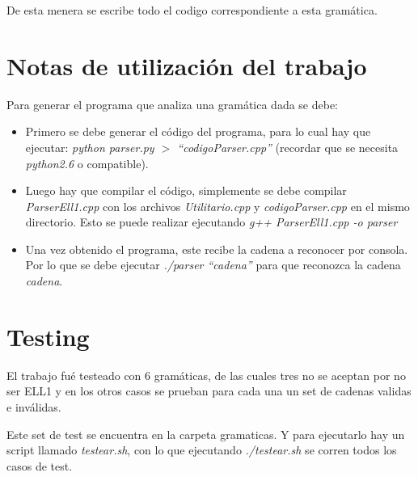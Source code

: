 \documentclass[a4paper]{report}
\begin{document}
De esta menera se escribe todo el codigo correspondiente a esta gramática.

\section*{Notas de utilización del trabajo}

Para generar el programa que analiza una gramática dada se debe:
\begin{itemize}
\item Primero se debe generar el código del programa, para lo cual hay que ejecutar: \emph{python parser.py $>$ ``codigoParser.cpp''} (recordar que se necesita \emph{python2.6} o compatible).
\item Luego hay que compilar el código, simplemente se debe compilar \emph{ParserEll1.cpp} con los archivos \emph{Utilitario.cpp} y \emph{codigoParser.cpp} en el mismo directorio. Esto se puede realizar ejecutando \emph{g++ ParserEll1.cpp -o parser}
\item Una vez obtenido el programa, este recibe la cadena a reconocer por consola. Por lo que se debe ejecutar \emph{./parser ``cadena''} para que reconozca la cadena \emph{cadena}.
\end{itemize}

\section*{Testing}

El trabajo fué testeado con 6 gramáticas, de las cuales tres no se aceptan por no ser ELL1 y en los otros casos se prueban para cada una un set de cadenas validas e inválidas.

Este set de test se encuentra en la carpeta gramaticas. Y para ejecutarlo hay un script llamado \emph{testear.sh}, con lo que ejecutando \emph{./testear.sh} se corren todos los casos de test.
\end{document}
